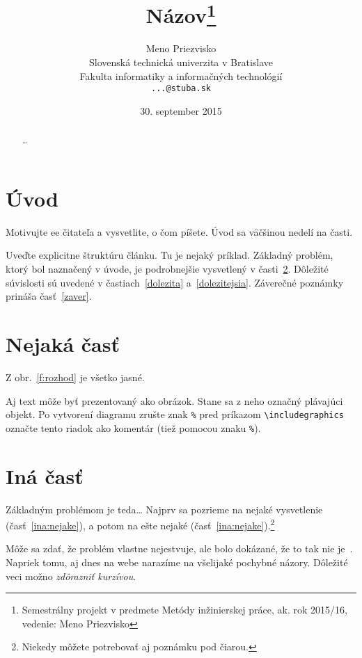 \documentclass[10pt,slovak,a4paper]{IEEEtran}
\title{Názov\thanks{Semestrálny projekt v predmete Metódy inžinierskej práce, ak. rok 2015/16, vedenie: Meno Priezvisko}} %
\author{Meno Priezvisko\\[2pt]
	{\small Slovenská technická univerzita v Bratislave}\\
	{\small Fakulta informatiky a informačných technológií}\\
	{\small \texttt{...@stuba.sk}}
	}
\date{\small 30. september 2015} %
\begin{document}
\maketitle

\begin{abstract}
\ldots
\end{abstract}



\section{Úvod}

Motivujte ee čitateľa a vysvetlite, o čom píšete. Úvod sa väčšinou nedelí na časti.

Uveďte explicitne štruktúru článku. Tu je nejaký príklad.
Základný problém, ktorý bol naznačený v úvode, je podrobnejšie vysvetlený v časti~\ref{nejaka}.
Dôležité súvislosti sú uvedené v častiach~\ref{dolezita} a~\ref{dolezitejsia}.
Záverečné poznámky prináša časť~\ref{zaver}.

\section{Nejaká časť} \label{nejaka}

Z obr.~\ref{f:rozhod} je všetko jasné. 

\begin{figure*}[tbh]
\centering
Aj text môže byť prezentovaný ako obrázok. Stane sa z neho označný plávajúci objekt. Po vytvorení diagramu zrušte znak \texttt{\%} pred príkazom \verb|\includegraphics| označte tento riadok ako komentár (tiež pomocou znaku \texttt{\%}).
\caption{Rozhodujúci argument.}
\label{f:rozhod}
\end{figure*}



\section{Iná časť} \label{ina}

Základným problémom je teda\ldots{} Najprv sa pozrieme na nejaké vysvetlenie (časť~\ref{ina:nejake}), a potom na ešte nejaké (časť~\ref{ina:nejake}).\footnote{Niekedy môžete potrebovať aj poznámku pod čiarou.}

Môže sa zdať, že problém vlastne nejestvuje\cite{Coplien:MPD}, ale bolo dokázané, že to tak nie je~\cite{Czarnecki:Staged, Czarnecki:Progress}. Napriek tomu, aj dnes na webe narazíme na všelijaké pochybné názory\cite{PLP-Framework}. Dôležité veci možno \emph{zdôrazniť kurzívou}.
\end{document}
